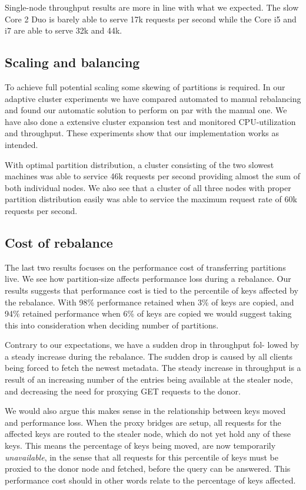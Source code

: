 Single-node throughput results are more in line with what we expected. The slow Core 2 Duo is barely able to serve 17k requests per second while the Core i5 and i7 are able to serve 32k and 44k. 

\subsection{Scaling and balancing}
\label{eval:balance}
To achieve full potential scaling some skewing of partitions is required. In our adaptive cluster experiments we have compared automated to manual rebalancing and found our automatic solution to perform on par with the manual one. We have also done a extensive cluster expansion test and monitored CPU-utilization and throughput. These experiments show that our implementation works as intended. 

With optimal partition distribution, a cluster consisting of the two slowest machines was able to service 46k requests per second providing almost the sum of both individual nodes. We also see that a cluster of all three nodes with proper partition distribution easily was able to service the maximum request rate of 60k requests per second. 

\subsection{Cost of rebalance}
The last two results focuses on the performance cost of transferring partitions live. We see how partition-size affects performance loss during a rebalance. Our results suggests that performance cost is tied to the percentile of keys affected by the rebalance. With 98\% performance retained when 3\% of keys are copied, and 94\% retained performance when 6\% of keys are copied we would suggest taking this into consideration when deciding number of partitions.

Contrary to our expectations, we have a sudden drop in throughput fol- lowed by a steady increase during the rebalance. The sudden drop is caused by all clients being forced to fetch the newest metadata. The steady increase in throughput is a result of an increasing number of the entries being available at the stealer node, and decreasing the need for proxying GET requests to the donor.

We would also argue this makes sense in the relationship between keys moved and performance loss.
When the proxy bridges are setup, all requests for the affected keys are routed to the stealer node, which do not yet hold any of these keys. 
This means the percentage of keys being moved, are now temporarily \emph{unavailable}, in the sense that all requests for this percentile of keys must be proxied to the donor node and fetched, before the query can be answered. This performance cost should in other words relate to the percentage of keys affected.

